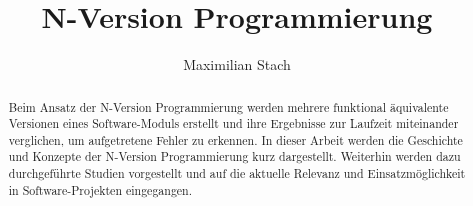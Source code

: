 \title{N-Version Programmierung}



\author{Maximilian Stach}
%




\maketitle


\begin{abstract}
Beim Ansatz der N-Version Programmierung werden mehrere funktional äquivalente Versionen eines Software-Moduls erstellt und ihre Ergebnisse zur Laufzeit miteinander verglichen, um aufgetretene Fehler zu erkennen.
In dieser Arbeit werden die Geschichte und Konzepte der N-Version Programmierung kurz dargestellt. Weiterhin werden dazu durchgeführte Studien vorgestellt und auf die aktuelle Relevanz und Einsatzmöglichkeit in Software-Projekten eingegangen.


\end{abstract}
